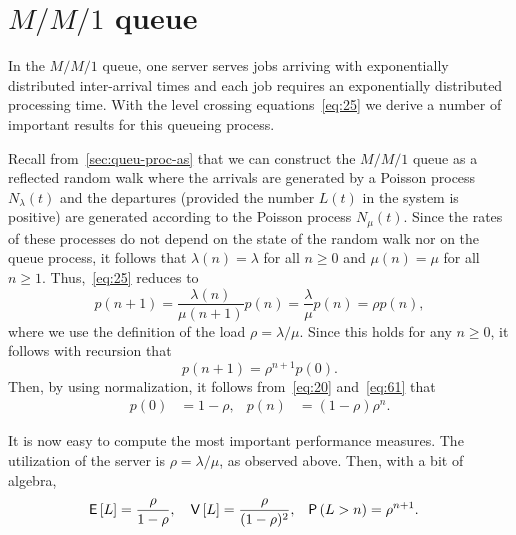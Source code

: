 \section
{$M/M/1$ queue}
\label{sec:mm1}




In the $M/M/1$ queue, one server serves jobs arriving with exponentially distributed inter-arrival times and each job requires an exponentially distributed processing time.
With the level crossing equations~\cref{eq:25} we  derive a number of important results for this queueing process.

Recall from~\cref{sec:queu-proc-as} that we can construct the $M/M/1$ queue as a reflected random walk where the arrivals are generated by a Poisson process $N_\lambda(t)$ and the departures (provided the number $L(t)$ in the system is positive) are generated according to the Poisson process $N_\mu(t)$.
Since the rates of these processes do not depend on the state of the random walk nor on the queue process, it follows that $\lambda(n)=\lambda$ for all $n \geq 0$ and $\mu(n)=\mu$ for all $n \geq 1$.
Thus,~\cref{eq:25} reduces to
\begin{equation*}
  p(n+1) = \frac{\lambda(n)}{\mu(n+1)} p(n) = \frac{\lambda}{\mu} p(n) = \rho p(n),
\end{equation*}
where we use the definition of the load $\rho=\lambda/\mu$. Since this
holds for any $n\geq 0$, it follows with recursion that
\begin{equation*}
  p(n+1) = \rho^{n+1} p(0).
\end{equation*}
Then, by using normalization, 
it follows from~\cref{eq:20} and~\cref{eq:61} that
\begin{align}\label{eq:23}
p(0) &=1-\rho, &   p(n) &=  (1-\rho)\rho^{n}.
\end{align}

It is now easy to compute the most important performance measures.
The utilization of the server is $\rho=\lambda/\mu$, as observed above.
Then, with a bit of algebra,
\begin{align}\label{eq:el}
  \E L &= \frac \rho{1-\rho}, & \V L &= \frac{\rho}{(1-\rho)^2}, & \P{L>  n} &= \rho^{n+1}.
\end{align}




